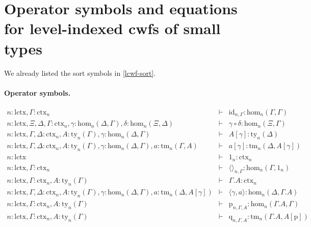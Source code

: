 \documentclass[submission,copyright,creativecommons]{eptcs}
\newcommand{\id}{\mathsf{id}}
\def\sub{\mathrm{hom}}
\def\id{\mathrm{id}}
\def\lctx{\mathrm{lctx}}
\def\lp{\mathrm{lp}}
\newcommand{\ctx}{\mathrm{ctx}}
\newcommand{\ty}{\mathrm{ty}}
\newcommand{\tm}{\mathrm{tm}}
\newcommand{\tuple}[1]{\langle #1 \rangle}
\newcommand{\cext}{.}
\def\p{\mathrm{p}}
\def\q{\mathrm{q}}
\begin{document}



\appendix
\section{Operator symbols and equations for level-indexed cwfs of small types}

We already listed the sort symbols in \ref{lcwf-sort}.

\paragraph{Operator symbols.}
\begin{eqnarray*}
n : \lctx, \Gamma : \ctx_n &\vdash& \id_{n,\Gamma} : \sub_n(\Gamma,\Gamma)\\
n : \lctx, \Xi,\Delta,\Gamma : \ctx_n, \gamma : \sub_n(\Delta,\Gamma), \delta : \sub_n(\Xi,\Delta) &\vdash&
\gamma \circ \delta : \sub_n(\Xi,\Gamma)\\
n : \lctx, \Gamma,\Delta : \ctx_n, A:\ty_n(\Gamma), \gamma : \sub_n(\Delta,\Gamma) &\vdash&
A[\gamma] : \ty_n(\Delta)\\
n : \lctx, \Gamma,\Delta : \ctx_n, A:\ty_n(\Gamma), \gamma : \sub_n(\Delta,\Gamma), a:\tm_n(\Gamma,A) &\vdash&  a[\gamma] : \tm_n(\Delta,A[\gamma])\\
n : \lctx &\vdash& 1_n : \ctx_n\\
n : \lctx, \Gamma : \ctx_n &\vdash& \tuple{}_{n,\Gamma} : \sub_n(\Gamma,1_n)\\
n : \lctx, \Gamma : \ctx_n, A:\ty_n (\Gamma) &\vdash& \Gamma \cext A : \ctx_n \\
n : \lctx, \Gamma,\Delta : \ctx_n , A:\ty_n (\Gamma), \gamma : \sub_n (\Delta,\Gamma), a:\tm_n (\Delta,A[\gamma]) &\vdash& \tuple{\gamma,a} : \sub_n (\Delta,\Gamma\cext A)\\
n : \lctx, \Gamma : \ctx_n , A:\ty_n (\Gamma) &\vdash& \p_{n,\Gamma,A}: \sub_n (\Gamma\cext A,\Gamma)\\
n : \lctx, \Gamma : \ctx_n , A:\ty_n (\Gamma) &\vdash& \q_{n,\Gamma,A}: \tm_n (\Gamma\cext A,A[\p])
\end{eqnarray*}
\end{document}

